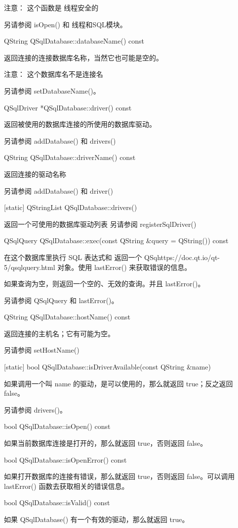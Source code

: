 注意： 这个函数是 线程安全的

另请参阅 isOpen() 和 线程和SQL模块。

QString QSqlDatabase::databaseName() const


返回连接的连接数据库名称，当然它也可能是空的。

注意： 这个数据库名不是连接名

另请参阅 setDatabaseName()。

QSqlDriver *QSqlDatabase::driver() const


返回被使用的数据库连接的所使用的数据库驱动。

另请参阅 addDatabase() 和 drivers()

QString QSqlDatabase::driverName() const


返回连接的驱动名称

另请参阅 addDatabase() 和 driver()

[static] QStringList QSqlDatabase::drivers()


返回一个可使用的数据库驱动列表 另请参阅 registerSqlDriver()

QSqlQuery QSqlDatabase::exec(const QString \&query = QString()) const


在这个数据库里执行 SQL 表达式和 返回一个 QSqhttps://doc.qt.io/qt-5/qsqlquery.html 对象。使用 lastError() 来获取错误的信息。

如果查询为空，则返回一个空的、无效的查询。并且 lastError()。

另请参阅 QSqlQuery 和 lastError()。

QString QSqlDatabase::hostName() const


返回连接的主机名；它有可能为空。

另请参阅 setHostName()

[static] bool QSqlDatabase::isDriverAvailable(const QString \&name)


如果调用一个叫 name 的驱动，是可以使用的，那么就返回 true；反之返回 false。

另请参阅 drivers()。

bool QSqlDatabase::isOpen() const


如果当前数据库连接是打开的，那么就返回 true，否则返回 false。

bool QSqlDatabase::isOpenError() const


如果打开数据库的连接有错误，那么就返回 true，否则返回 false。可以调用 lastError() 函数去获取相关的错误信息。

bool QSqlDatabase::isValid() const


如果 QSqlDatabase() 有一个有效的驱动，那么就返回 true。

